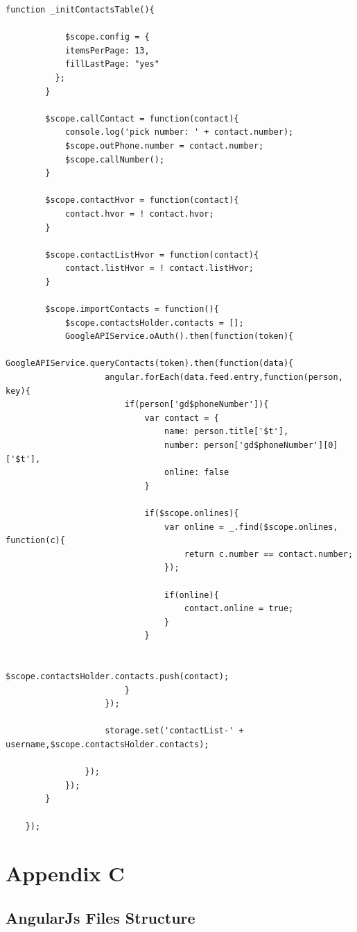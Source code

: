 \begin{appendices}
\begin{lstlisting}[caption={ContactsCtrl.js in application client},label={code:contact_ctrl}]
		function _initContactsTable(){

			$scope.config = {
		    itemsPerPage: 13,
		    fillLastPage: "yes"
		  };
		}

		$scope.callContact = function(contact){
			console.log('pick number: ' + contact.number);
			$scope.outPhone.number = contact.number;
			$scope.callNumber();
		}

		$scope.contactHvor = function(contact){
			contact.hvor = ! contact.hvor;
		}

		$scope.contactListHvor = function(contact){
			contact.listHvor = ! contact.listHvor;
		}

		$scope.importContacts = function(){
			$scope.contactsHolder.contacts = [];
			GoogleAPIService.oAuth().then(function(token){
				GoogleAPIService.queryContacts(token).then(function(data){
					angular.forEach(data.feed.entry,function(person, key){
						if(person['gd$phoneNumber']){
							var contact = {
								name: person.title['$t'],
								number: person['gd$phoneNumber'][0]['$t'],
								online: false
							}

							if($scope.onlines){
								var online = _.find($scope.onlines, function(c){
									return c.number == contact.number; 
								});

								if(online){
									contact.online = true;
								}
							}

							$scope.contactsHolder.contacts.push(contact);
						}
					});

					storage.set('contactList-' + username,$scope.contactsHolder.contacts);

				});
			});
		}

	});
\end{lstlisting}

\chapter{Appendix C}

\section{AngularJs Files Structure} \label{code:angularjs_structure}


\end{appendices}
